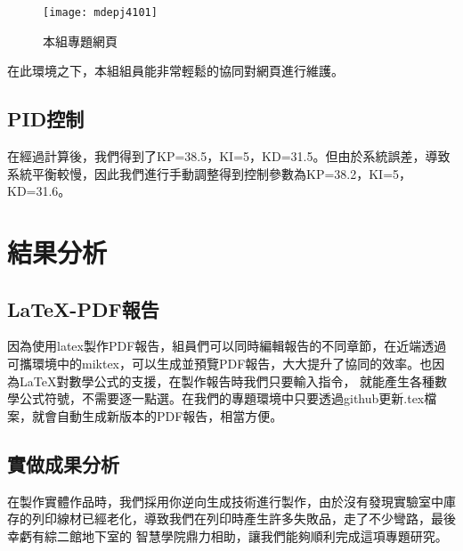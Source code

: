 \begin{figure}[h]
    \centering
    \texttt{[image: mdepj4101]}
    \caption{本組專題網頁}
\end{figure}

在此環境之下，本組組員能非常輕鬆的協同對網頁進行維護。\\




\subsection{PID控制}
在經過計算後，我們得到了KP=38.5，KI=5，KD=31.5。但由於系統誤差，導致系統平衡較慢，因此我們進行手動調整得到控制參數為KP=38.2，KI=5，KD=31.6。\\



\section{結果分析}

\subsection{LaTeX-PDF報告}
因為使用latex製作PDF報告，組員們可以同時編輯報告的不同章節，在近端透過可攜環境中的miktex，可以生成並預覽PDF報告，大大提升了協同的效率。也因為LaTeX對數學公式的支援，在製作報告時我們只要輸入指令，
就能產生各種數學公式符號，不需要逐一點選。在我們的專題環境中只要透過github更新.tex檔案，就會自動生成新版本的PDF報告，相當方便。\\

\subsection{實做成果分析}
在製作實體作品時，我們採用你逆向生成技術進行製作，由於沒有發現實驗室中庫存的列印線材已經老化，導致我們在列印時產生許多失敗品，走了不少彎路，最後幸虧有綜二館地下室的
智慧學院鼎力相助，讓我們能夠順利完成這項專題研究。